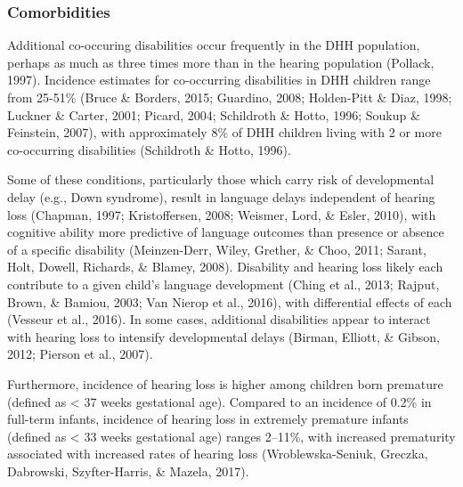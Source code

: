 \documentclass[english,man]{apa6}
\begin{document}
\hypertarget{comorbidities}{%
\subsubsection{Comorbidities}\label{comorbidities}}

Additional co-occuring disabilities occur frequently in the DHH population, perhaps as much as three times more than in the hearing population (Pollack, 1997). Incidence estimates for co-occurring disabilities in DHH children range from 25-51\% (Bruce \& Borders, 2015; Guardino, 2008; Holden-Pitt \& Diaz, 1998; Luckner \& Carter, 2001; Picard, 2004; Schildroth \& Hotto, 1996; Soukup \& Feinstein, 2007), with approximately 8\% of DHH children living with 2 or more co-occurring disabilities (Schildroth \& Hotto, 1996).

Some of these conditions, particularly those which carry risk of developmental delay (e.g., Down syndrome), result in language delays independent of hearing loss (Chapman, 1997; Kristoffersen, 2008; Weismer, Lord, \& Esler, 2010), with cognitive ability more predictive of language outcomes than presence or absence of a specific disability (Meinzen-Derr, Wiley, Grether, \& Choo, 2011; Sarant, Holt, Dowell, Richards, \& Blamey, 2008). Disability and hearing loss likely each contribute to a given child's language development (Ching et al., 2013; Rajput, Brown, \& Bamiou, 2003; Van Nierop et al., 2016), with differential effects of each (Vesseur et al., 2016). In some cases, additional disabilities appear to interact with hearing loss to intensify developmental delays (Birman, Elliott, \& Gibson, 2012; Pierson et al., 2007).

Furthermore, incidence of hearing loss is higher among children born premature (defined as \textless{} 37 weeks gestational age). Compared to an incidence of 0.2\% in full-term infants, incidence of hearing loss in extremely premature infants (defined as \textless{} 33 weeks gestational age) ranges 2--11\%, with increased prematurity associated with increased rates of hearing loss (Wroblewska-Seniuk, Greczka, Dabrowski, Szyfter-Harris, \& Mazela, 2017).
\end{document}
